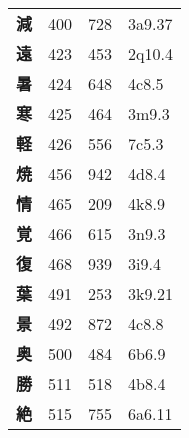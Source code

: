 \begin{longtable}[c]{llll}
    \bfseries 減 & 400 & 728 & 3a9.37\\
    \bfseries 遠 & 423 & 453 & 2q10.4\\
    \bfseries 暑 & 424 & 648 & 4c8.5\\
    \bfseries 寒 & 425 & 464 & 3m9.3\\
    \bfseries 軽 & 426 & 556 & 7c5.3\\
    \bfseries 焼 & 456 & 942 & 4d8.4\\
    \bfseries 情 & 465 & 209 & 4k8.9\\
    \bfseries 覚 & 466 & 615 & 3n9.3\\
    \bfseries 復 & 468 & 939 & 3i9.4\\
    \bfseries 葉 & 491 & 253 & 3k9.21\\
    \bfseries 景 & 492 & 872 & 4c8.8\\
    \bfseries 奥 & 500 & 484 & 6b6.9\\
    \bfseries 勝 & 511 & 518 & 4b8.4\\
    \bfseries 絶 & 515 & 755 & 6a6.11\\
  \end{longtable}
